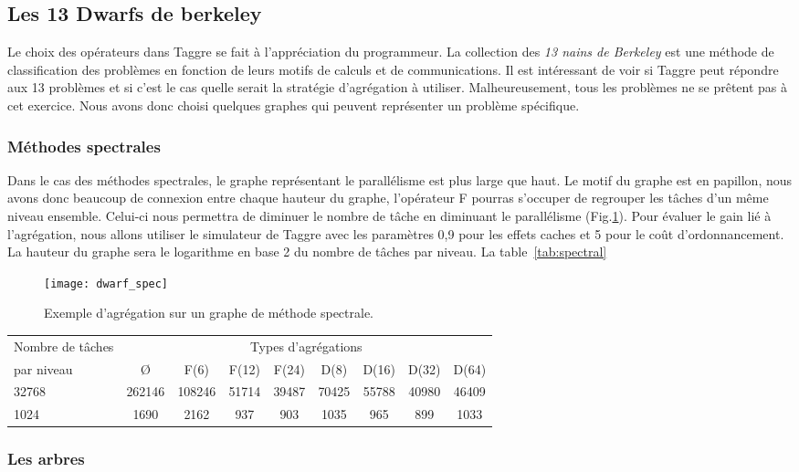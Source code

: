\subsection{Les 13 Dwarfs de berkeley}
Le choix des opérateurs dans Taggre se fait à l'appréciation du programmeur.
%
La collection des {\em 13 nains de Berkeley}\cite{dwarfs} est une méthode de classification des problèmes en fonction de leurs motifs de calculs et de communications.
%
Il est intéressant de voir si Taggre peut répondre aux 13 problèmes et si c'est le cas quelle serait la stratégie d'agrégation à utiliser.
%
Malheureusement, tous les problèmes ne se prêtent pas à cet exercice.
%
Nous avons donc choisi quelques graphes qui peuvent représenter un problème spécifique.


\subsubsection{Méthodes spectrales}
Dans le cas des méthodes spectrales, le graphe représentant le parallélisme est plus large que haut.
%
Le motif du graphe est en papillon, nous avons donc beaucoup de connexion entre chaque hauteur du graphe, l'opérateur F pourras s'occuper de regrouper les tâches d'un même niveau ensemble.
%
Celui-ci nous permettra de diminuer le nombre de tâche en diminuant le parallélisme (Fig.\ref{fig:dwarf_spec}).
%
Pour évaluer le gain lié à l'agrégation, nous allons utiliser le simulateur de Taggre avec les paramètres 0,9 pour les effets caches et 5 pour le coût d'ordonnancement.
%
La hauteur du graphe sera le logarithme en base 2 du nombre de tâches par niveau.
%
La table~\ref{tab:spectral}


\begin{figure}
  \centering
  \texttt{[image: dwarf\_spec]}
  \caption{Exemple d'agrégation sur un graphe de méthode spectrale.}
  \label{fig:dwarf_spec}
\end{figure}

\begin{center}
  \begin{tabular}{|l|c|c|c|c|c|c|c|c|}
    \hline
   Nombre de tâches &  \multicolumn{8}{c|}{Types d'agrégations}\\
   par niveau & \O & F(6) & F(12) & F(24) & D(8) & D(16) & D(32) & D(64) \\
    \hline
   32768 & 262146 & 108246 & 51714 & 39487 & 70425 & 55788 & 40980 & 46409 \\
   1024  & 1690 & 2162 & 937 & 903 & 1035 & 965 & 899 & 1033 \\
    \hline
  \end{tabular}
  \label{tab:spectral}
\end{center}


\subsubsection{Les arbres}
